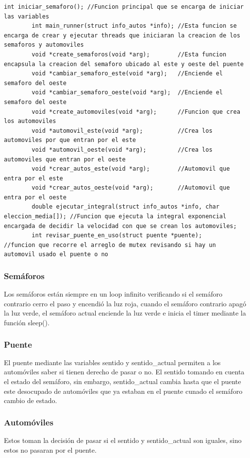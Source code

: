 \documentclass[16pt,a4papper]{article}
\begin{document}
	\begin{lstlisting}[style=CStyle]
		int iniciar_semaforo(); //Funcion principal que se encarga de iniciar las variables
		int main_runner(struct info_autos *info); //Esta funcion se encarga de crear y ejecutar threads que iniciaran la creacion de los semaforos y automoviles
		void *create_semaforos(void *arg);        //Esta funcion encapsula la creacion del semaforo ubicado al este y oeste del puente
		void *cambiar_semaforo_este(void *arg);   //Enciende el semaforo del oeste
		void *cambiar_semaforo_oeste(void *arg);  //Enciende el semaforo del oeste
		void *create_automoviles(void *arg);      //Funcion que crea los automoviles
		void *automovil_este(void *arg);          //Crea los automoviles por que entran por el este
		void *automovil_oeste(void *arg);         //Crea los automoviles que entran por el oeste
		void *crear_autos_este(void *arg);		  //Automovil que entra por el este	
		void *crear_autos_oeste(void *arg);       //Automovil que entra por el oeste
		double ejecutar_integral(struct info_autos *info, char eleccion_media[]); //Funcion que ejecuta la integral exponencial encargada de decidir la velocidad con que se crean los automoviles;
		int revisar_puente_en_uso(struct puente *puente);                         //funcion que recorre el arreglo de mutex revisando si hay un automovil usado el puente o no
	\end{lstlisting}

	\subsubsection{Semáforos}
	Los semáforos están siempre en un loop infinito verificando si el semáforo contrario cerro el paso y encendió la luz roja, cuando el semáforo contrario apagó la luz verde, el semáforo actual enciende la luz verde e inicia el timer mediante la función sleep().
	
	\subsubsection{Puente}
	El puente mediante las variables sentido y sentido\_actual permiten a los automóviles saber si tienen derecho de pasar o no. El sentido tomando en cuenta el estado del semáforo, sin embargo, sentido\_actual cambia hasta que el puente este desocupado de automóviles que ya estaban en el puente cunado el semáforo cambio de estado.
	
	\subsubsection{Automóviles}
	Estos toman la decisión de pasar si el sentido y sentido\_actual son iguales, sino estos no pasaran por el puente.
	
\end{document}
